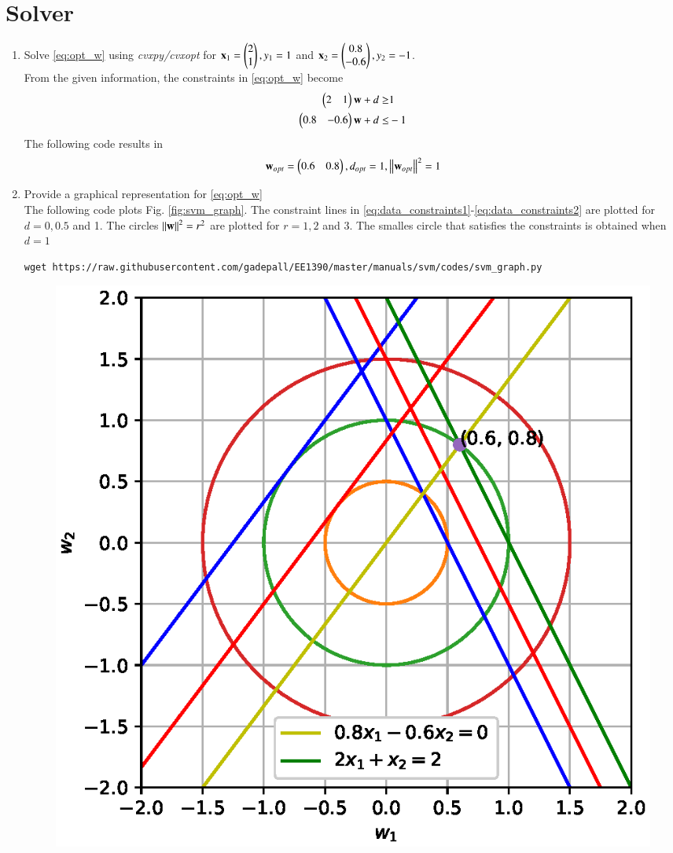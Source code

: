 \documentclass[journal,12pt,twocolumn]{IEEEtran}
\renewcommand\thesection{\arabic{section}}
\begin{document}
\section{Solver}
\begin{enumerate}[label=\thesection.\arabic*,ref=\thesection.\theenumi]

\item Solve \eqref{eq:opt_w} using {\em cvxpy/cvxopt} for $\mathbf{x}_1=\begin{pmatrix}2 \\ 1\end{pmatrix},y_1=1$ and 
$\mathbf{x}_2=\begin{pmatrix}0.8 \\ -0.6\end{pmatrix},y_2=-1$.
\\
\solution  From the given information, the constraints in \eqref{eq:opt_w} become
\begin{align}
\label{eq:data_constraints1}
\begin{pmatrix}2 & 1\end{pmatrix}\mathbf{w}+d \ge&1
\\
\begin{pmatrix}0.8 & -0.6\end{pmatrix}\mathbf{w}+d \le&-1
\label{eq:data_constraints2}
\end{align}
%
The following code results in 
\begin{align}
\mathbf{w}_{opt} = \begin{pmatrix}0.6 & 0.8\end{pmatrix}, d_{opt} = 1, 
\left\Vert\mathbf{w}_{opt}\right\Vert^2 = 1
\end{align}

\item Provide a graphical representation for  \eqref{eq:opt_w} 
\\
\solution The following code plots Fig. \ref{fig:svm_graph}.  The 
constraint lines in \eqref{eq:data_constraints1}-\eqref{eq:data_constraints2} are plotted for $d = 0, 
0.5$ 
and 1.  The circles $\left\Vert\mathbf{w}\right\Vert^2 = r^2$ are plotted for $r = 1,2$ and 
3. The smalles circle that satisfies the constraints is obtained when $d = 
1$
\begin{lstlisting}
wget https://raw.githubusercontent.com/gadepall/EE1390/master/manuals/svm/codes/svm_graph.py
\end{lstlisting}
%
\begin{figure}[!ht]
\centering
\includegraphics[width=\columnwidth]{./figs/svm_graph.eps}

\end{figure}
\end{enumerate}
\end{document}

